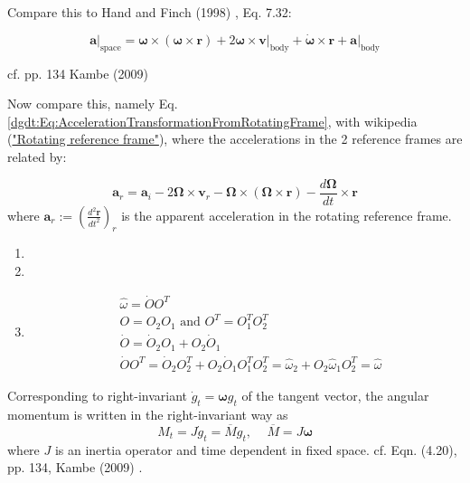 Compare this to  Hand and Finch (1998) \cite{dgdt:HaFi1998}, Eq. 7.32:

\begin{equation}
\left. \mathbf{a} \right|_{\text{space}} = \mathbf{\omega} \times (\mathbf{\omega} \times \mathbf{r} ) + 2 \mathbf{\omega} \times  \left. \mathbf{v} \right|_{\text{body}} + \dot{\mathbf{\omega}} \times \mathbf{r} + \left. \mathbf{a} \right|_{\text{body}}
\end{equation} 

cf. pp. 134 Kambe (2009) \cite{dgdt:TKambe2009}

Now compare this, namely Eq. \ref{dgdt:Eq:AccelerationTransformationFromRotatingFrame}, with wikipedia (\href{https://en.wikipedia.org/wiki/Rotating_reference_frame}{"Rotating reference frame"}), where the accelerations in the 2 reference frames are related by:

\begin{equation}
	\mathbf{a}_r = \mathbf{a}_i - 2\mathbf{\Omega} \times \mathbf{v}_r - \mathbf{\Omega} \times ( \mathbf{\Omega} \times \mathbf{r}) - \frac{d\mathbf{\Omega}}{dt} \times \mathbf{r}
\end{equation}
where $\mathbf{a}_r := \left( \frac{ d^2 \mathbf{r}}{dt^2} \right)_r$ is the apparent acceleration in the rotating reference frame.


\begin{enumerate}
	\item[(a)]
	\item[(b)]
	\item[(c)] \[
	\begin{aligned}
		& \widehat{\omega} = \dot{O} O^T \\
		& O = O_2 O_1 \text{ and } O^T = O_1^T O_2^T \\
		& \dot{O} = \dot{O}_2 O_1 + O_2 \dot{O}_1 \\
		& \dot{O}O^T = \dot{O}_2 O_2^T + O_2 \dot{O}_1 O_1^T O_2^T = \widehat{\omega}_2 + O_2 \widehat{\omega}_1 O_2^T = \widehat{\omega}
	\end{aligned}
	\]
\end{enumerate}

Corresponding to right-invariant $\dot{g}_t = \mathbf{\omega} g_t$ of the tangent vector, the angular momentum is written in the right-invariant way as 
\begin{equation}
M_t = J \dot{g}_t = \overline{M} g_t, \quad \, \overline{M} = J \mathbf{\omega}
\end{equation}
where $J$ is an inertia operator and time dependent in fixed space. cf. Eqn. (4.20), pp. 134, Kambe (2009) \cite{dgdt:TKambe2009}.


